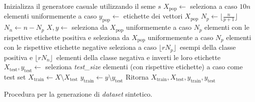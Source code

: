 \begin{algorithm}
    \SetAlgoLined
    Inizializza il generatore casuale utilizzando il seme $s$\;
    $X_{\text{pop}} \gets$ seleziona a caso $10n$ elementi uniformemente a caso\;
    $y_{\text{pop}} \gets$ etichette dei vettori $X_{\text{pop}}$\;
    $N_p \gets \lfloor\frac{n}{p + 1}\rfloor$\;
    $N_n \gets n - N_p$\;
    $X, y \gets$ seleziona da $X_{\text{pop}}$ uniformemente a caso $N_p$ elementi con le rispettive etichette positiva e seleziona da $X_{\text{pop}}$ uniformemente a caso $N_p$ elementi con le rispettive etichette negative\;
    seleziona a caso $\lfloor rN_p \rfloor$\ esempi della classe positiva e $\lfloor r  N_n \rfloor$\ elementi della classe negativa e inverti le loro etichette\;
    $X_{\text{test}}, y_{\text{test}} \gets$ seleziona \emph{test\_size} elementi (con rispettive etichette) a caso come test set\;
    $X_{\text{train}} \gets X \setminus X_{\text{test}}$\;
    $y_{\text{train}} \gets y \setminus y_{\text{test}}$\;
    Ritorna $X_{\text{train}}, X_{\text{test}}, y_{\text{train}}, y_{\text{test}}$\;
\caption{Procedura per la generazione di \emph{dataset} sintetico.}
\label{alg:generazione_dataset_sintetici}
\end{algorithm}

